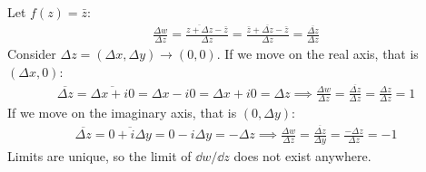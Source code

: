 \documentclass[12pt, english]{book}
\begin{document}
	\begin{example}
		Let $f(z) = \bar{z}$:
		\begin{align*}
			\frac{\Delta w}{\Delta z} = \frac{\overline{z + \Delta z} - \bar{z}}{\Delta z} = \frac{\bar{z} + \overline{\Delta z} - \bar{z}}{\Delta z} = \frac{\overline{\Delta z}}{\Delta z}
		\end{align*}
	Consider $\Delta z = (\Delta x, \Delta y) \rightarrow (0,0)$. If we move on the real axis, that is $(\Delta x, 0)$:
	\begin{align*}
		\overline{\Delta z} = \overline{\Delta x + i0} = \Delta x - i0  = \Delta x + i0 = \Delta z 
		\implies \frac{\Delta w}{\Delta z} = \frac{\overline{\Delta z}}{\Delta z} = \frac{\Delta z}{\Delta z} = 1
	\end{align*}
	If we move on the imaginary axis, that is $(0, \Delta y)$:
	\begin{align*}
		\overline{\Delta z} = \overline{0 + i\Delta y} = 0 - i \Delta y = - \Delta z
		\implies \frac{\Delta w}{\Delta z} = \frac{\overline{\Delta z}}{\Delta y} = \frac{-\Delta z}{\Delta z} =  -1
	\end{align*}
	Limits are unique, so the limit of $\dd w / \dd z$ does not exist anywhere. 
	\end{example}
\end{document}
